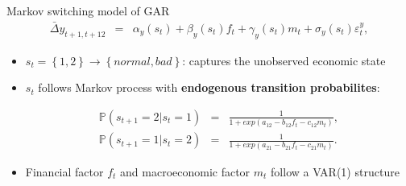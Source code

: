\documentclass[xcolor=dvipsnames, xcolor=table, 10pt]{beamer}
\begin{document}

\begin{frame}{Markov switching model of GAR}
\vspace*{-0.2in}
\begin{eqnarray*}
\bar{\Delta} {y}_{t+1,t+12} &=& \alpha_y (s_t) + \beta_y (s_t) f_t + \gamma_y (s_t) m_t + \sigma_y (s_t) \varepsilon^y_t, \label{eq:MS_growth}%
\end{eqnarray*}

\begin{itemize}
    \item $s_t=\left\{1,2\right\} \rightarrow \left\{normal, bad\right\}$: captures the unobserved economic state
\bigskip
\item $s_t$ follows Markov process with \textbf{endogenous transition probabilites}:

\begin{eqnarray*}
\mathbb{P}\left(s_{t+1} = 2 | s_t = 1\right) &=& \frac{1}{1+exp(a_{12} - b_{12} f_t - c_{12} m_t)},\\
\mathbb{P}\left(s_{t+1} = 1 | s_t = 2\right) &=& \frac{1}{1+exp(a_{21} - b_{21} f_t - c_{21} m_t)}.
\end{eqnarray*}

\end{itemize}

\begin{itemize}
\item Financial factor $f_t$ and macroeconomic factor $m_t$ follow a VAR(1) structure
\end{itemize}
\end{frame}
\end{document}
